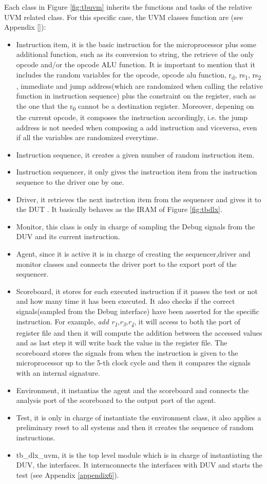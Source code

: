 Each class in Figure \ref{fig:tbuvm} inherits the functions and tasks of the relative UVM related class. For this specific case, the UVM classes function are (see Appendix \ref{}):
\begin{itemize}
\item Instruction item, it is the basic instruction for the microprocessor plus some additional function, such as its conversion to string, the retrieve of the only opcode and/or the opcode ALU function. It is important to mention that it includes the random variables for the opcode, opcode alu function, r\textsubscript{d}, rs\textsubscript{1}, rs\textsubscript{2} , immediate and jump address(which are randomized when calling the relative function in instruction sequence) plus the constraint on the register, such as the one that the r\textsubscript{0} cannot be a destination register. Moreover, depening on the current opcode, it composes the instruction accordingly, i.e. the jump address is not needed when composing a add instruction and viceversa, even if all the variables are randomized everytime.
\item Instruction sequence, it creates a given number of random instruction item.
\item Instruction sequencer, it only gives the instruction item from the instruction sequence to the driver one by one.
\item Driver, it retrieves the next instrction item from the sequencer and gives it to the DUT . It basically behaves as the IRAM of Figure \ref{fig:tbdlx}.
\item Monitor, this class is only in charge of sampling the Debug signals from the DUV and its current instruction.
\item Agent, since it is active it is in charge of creating the sequencer,driver and monitor classes and connects the driver port to the export port of the sequencer.
\item Scoreboard, it stores for each executed instruction if it passes the test or not and how many time it has been executed. It also checks if the correct signals(sampled from the Debug interface) have been asserted for the specific instruction. For example, \textit{add r\textsubscript{1},r\textsubscript{3},r\textsubscript{4}}, it will access to both the port of register file and then it will compute the addition between the accessed values and as last step it will write back the value in the register file. The scoreboard stores the signals from when the instruction is given to the microprocessor up to the 5-th clock cycle and then it compares the signals with an internal signature.
\item Environment, it instantias the agent and the scoreboard and connects the analysis port of the scoreboard to the output port of the agent.
\item Test, it is only in charge of instantiate the environment class, it also applies a preliminary reset to all systems and then it creates the sequence of random instructions.
\item tb\_dlx\_uvm, it is the top level module which is in charge of instantiating the DUV, the interfaces. It internconnects the interfaces with DUV and starts the test (see Appendix \ref{appendix6}).
\end{itemize}
